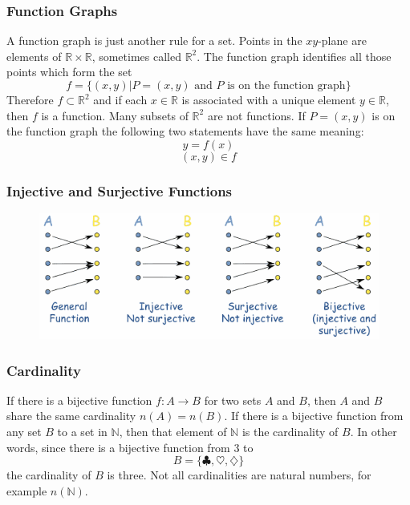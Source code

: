 \documentclass[xcolor=dvipsnames]{beamer}
\begin{document}
\begin{frame}
  \frametitle{Function Graphs}
  A \alert{function graph} is just another rule for a set.
  \alert{Points} in the $xy$-plane are elements of
  $\mathbb{R}\times\mathbb{R}$, sometimes called $\mathbb{R}^{2}$. The
  function graph identifies all those points which form the set
  \begin{equation}
    \label{eq:oongaiku}
    f=\{(x,y)|P=(x,y)\mbox{ and }P\mbox{ is on the function graph}\}
  \end{equation}
Therefore $f\subset\mathbb{R}^{2}$ and if each $x\in\mathbb{R}$ is
associated with a unique element $y\in\mathbb{R}$, then $f$ is a
function. Many subsets of $\mathbb{R}^{2}$ are not functions. If
$P=(x,y)$ is on the function graph the following two statements have
the same meaning:
\begin{equation}
  \label{eq:aipeejae}
  y=f(x)
\end{equation}
\begin{equation}
  \label{eq:aecaekax}
  (x,y)\in{}f
\end{equation}
\end{frame}

\begin{frame}
  \frametitle{Injective and Surjective Functions}
  \begin{figure}[h]
    \includegraphics[scale=0.6]{./function-mapping.png}
  \end{figure}
\end{frame}

\begin{frame}
  \frametitle{Cardinality}
If there is a bijective function $f:A\rightarrow{}B$ for two sets $A$
and $B$, then $A$ and $B$ share the same cardinality $n(A)=n(B)$.
If there is a bijective function from any set $B$ to a set in
$\mathbb{N}$, then that element of $\mathbb{N}$ is the cardinality of
$B$. In other words, since there is a  bijective function from 3 to
\begin{equation}
  \label{eq:ohriohar}
  B=\{\clubsuit,\heartsuit,\diamondsuit\}
\end{equation}
the cardinality of $B$ is three. Not all cardinalities are natural
numbers, for example $n(\mathbb{N})$.
\end{frame}
\end{document}
